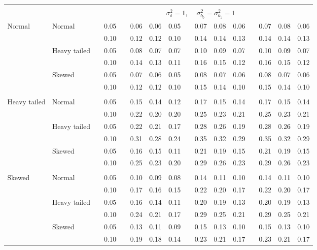 \documentclass[12pt]{article} %
\begin{document}
\begin{table}[ht]
\begin{scriptsize}
\begin{center}
\begin{tabular}{ll p{.1cm} c p{.1cm} rrr p{.1cm} rrr p{.1cm} rrr}
&&&&&&&&&&&&&&&\\
& && && \multicolumn{9}{c}{$\sigma_{\varepsilon}^2 = 1$, \ \ $\sigma_{b_0}^2 = \sigma_{b_1}^2 = 1$} \\ \cline{6-16}
\rowcolor{gray!20}Normal       & Normal       && 0.05 &&   0.06 & 0.06 & 0.05 && 0.07 & 0.08 & 0.06 && 0.07 & 0.08 & 0.06 \\ 
\rowcolor{gray!20}             &              && 0.10 &&   0.12 & 0.12 & 0.10 && 0.14 & 0.14 & 0.13 && 0.14 & 0.14 & 0.13 \\ 
\rowcolor{gray!20}             & Heavy tailed && 0.05 &&   0.08 & 0.07 & 0.07 && 0.10 & 0.09 & 0.07 && 0.10 & 0.09 & 0.07 \\ 
\rowcolor{gray!20}             &              && 0.10 &&   0.14 & 0.13 & 0.11 && 0.16 & 0.15 & 0.12 && 0.16 & 0.15 & 0.12 \\ 
\rowcolor{gray!20}             & Skewed       && 0.05 &&   0.07 & 0.06 & 0.05 && 0.08 & 0.07 & 0.06 && 0.08 & 0.07 & 0.06 \\ 
\rowcolor{gray!20}             &              && 0.10 &&   0.12 & 0.12 & 0.10 && 0.15 & 0.14 & 0.10 && 0.15 & 0.14 & 0.10 \\ 
             &&&&&&&&&&&&&&&\\
Heavy tailed & Normal       && 0.05 &&   0.15 & 0.14 & 0.12 && 0.17 & 0.15 & 0.14 && 0.17 & 0.15 & 0.14 \\ 
             &              && 0.10 &&   0.22 & 0.20 & 0.20 && 0.25 & 0.23 & 0.21 && 0.25 & 0.23 & 0.21 \\ 
             & Heavy tailed && 0.05 &&   0.22 & 0.21 & 0.17 && 0.28 & 0.26 & 0.19 && 0.28 & 0.26 & 0.19 \\ 
             &              && 0.10 &&   0.31 & 0.28 & 0.24 && 0.35 & 0.32 & 0.29 && 0.35 & 0.32 & 0.29 \\ 
             & Skewed       && 0.05 &&   0.16 & 0.15 & 0.11 && 0.21 & 0.19 & 0.15 && 0.21 & 0.19 & 0.15 \\ 
             &              && 0.10 &&   0.25 & 0.23 & 0.20 && 0.29 & 0.26 & 0.23 && 0.29 & 0.26 & 0.23 \\ 
             &&&&&&&&&&&&&&&\\
Skewed       & Normal       && 0.05 &&   0.10 & 0.09 & 0.08 && 0.14 & 0.11 & 0.10 && 0.14 & 0.11 & 0.10 \\ 
             &              && 0.10 &&   0.17 & 0.16 & 0.15 && 0.22 & 0.20 & 0.17 && 0.22 & 0.20 & 0.17 \\ 
             & Heavy tailed && 0.05 &&   0.16 & 0.14 & 0.11 && 0.20 & 0.19 & 0.13 && 0.20 & 0.19 & 0.13 \\ 
             &              && 0.10 &&   0.24 & 0.21 & 0.17 && 0.29 & 0.25 & 0.21 && 0.29 & 0.25 & 0.21 \\ 
             & Skewed       && 0.05 &&   0.13 & 0.11 & 0.09 && 0.15 & 0.13 & 0.10 && 0.15 & 0.13 & 0.10 \\ 
             &              && 0.10 &&   0.19 & 0.18 & 0.14 && 0.23 & 0.21 & 0.17 && 0.23 & 0.21 & 0.17 \\ 



\end{tabular}
\end{center}
\end{scriptsize}
\end{table}
\end{document}
